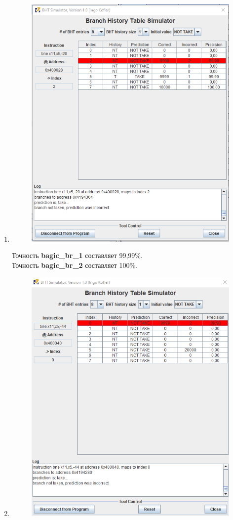 \begin{enumerate}
    \item 

\begin{figure}[H]
    \centering
    \includegraphics[width=0.75\linewidth]{Formal/BHT1.png}
\end{figure}
Точность \textbf{bagic\_br\_1} составляет 99,99\%.\\
Точность \textbf{bagic\_br\_2} составляет 100\%.
    \item 
\begin{figure}[H]
    \centering
    \includegraphics[width=0.75\linewidth]{Formal/BHT2.png}

\end{figure}
\end{enumerate}
